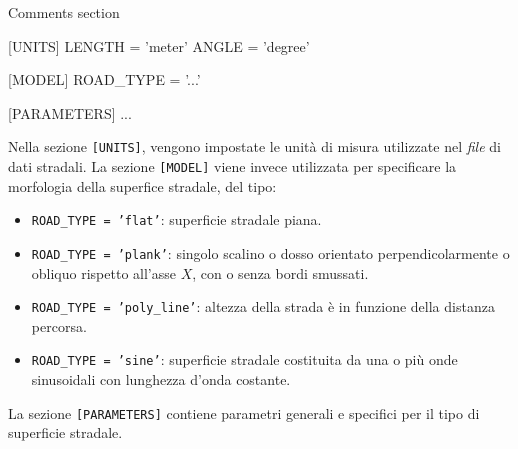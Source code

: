 \begin{pseudoc}
	{ Comments section }
	
	[UNITS]
	LENGTH = 'meter'
	ANGLE = 'degree'
	
	[MODEL]
	ROAD\_TYPE = '...'
	
	[PARAMETERS]
	...
\end{pseudoc}

Nella sezione \texttt{[UNITS]}, vengono impostate le unità di misura utilizzate nel \textit{file} di dati stradali. La sezione \texttt{[MODEL]} viene invece utilizzata per specificare la morfologia della superfice stradale, del tipo:
\begin{itemize}
	\item \texttt{ROAD\_TYPE = 'flat'}: superficie stradale piana.
	\item \texttt{ROAD\_TYPE = 'plank'}: singolo scalino o dosso orientato perpendicolarmente o obliquo rispetto all'asse $X$, con o senza bordi smussati.
	\item \texttt{ROAD\_TYPE = 'poly\_line'}: altezza della strada è in funzione della distanza percorsa.
	\item \texttt{ROAD\_TYPE = 'sine'}: superficie stradale costituita da una o più onde sinusoidali con lunghezza d'onda costante.
\end{itemize}
La sezione \texttt{[PARAMETERS]} contiene parametri generali e specifici per il tipo di superficie stradale.

